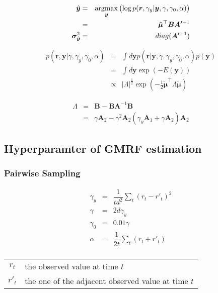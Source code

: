 \documentclass[platex, a4paper]{jsarticle}
\newcommand{\argmax}{\mathop{\rm argmax}\limits}
\begin{document}
\begin{eqnarray}
  \hat{\bm{y}}
      &=& \argmax_{\bm{y}} \left( \log p(\bm{r},\gamma_y | \bm{y},\gamma, \gamma_0, \alpha) \right)\\
      &=& \T{\tilde{\bm{\mu}}}\bm{B} \bm{A'}^{-1} \\
  \bm{\sigma_{\hat{\bm{y}}}}^2
      &=& diag (\bm{A'}^{-1}) \\
\end{eqnarray}

\begin{eqnarray}
  p( \bm{r}, \bm{y} | \gamma, \gamma_y, \gamma_0, \alpha)
    &=& \int d\bm{y}  p( \bm{r}|\bm{y}, \gamma, \gamma_y, \gamma_0, \alpha ) p(\bm{y} ) \\
    &=&  \int d\bm{y}  \exp\left(- E(\bm{y} ) \right) \\
    &\propto& |\Lambda|^{\frac{1}{2}}  \exp\left( - \frac{1}{2} \tilde{\bm{\mu}}^\top \Lambda \tilde{\bm{\mu}}\right)
\end{eqnarray}

\begin{eqnarray}
  \Lambda &=& \bm{B} - \bm{B} \bm{A}^{-1} \bm{B}\\
           &=& \gamma \bm{A}_2 - \gamma^2 \bm{A}_2 (\gamma_y \bm{A}_1 + \gamma \bm{A}_2) \bm{A}_2
\end{eqnarray}


\subsection{Hyperparamter of GMRF estimation}
\subsubsection{Pairwise Sampling}
\begin{eqnarray*}
\gamma_y &=& \dfrac{1}{td^2} \sum_t (r_t - {r'}_t)^2 \\
\gamma &=& 2d\gamma_y \\
\gamma_0 &=& 0.01 \gamma \\
\alpha &=& \dfrac{1}{2t} \sum_t (r_t + {r'}_t) \\
\end{eqnarray*}

\begin{table}[htb]
\begin{tabular}{cl}
${r}_t$&the observed value at time $t$ \\
${r'}_t$&the one of the adjacent observed value at time $t$\\
\end{tabular}
\end{table}
\end{document}
